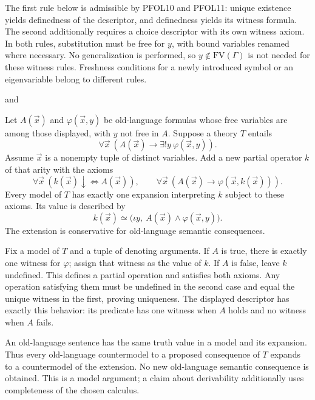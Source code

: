 The first rule below is admissible by PFOL10 and PFOL11: unique
existence yields definedness of the descriptor, and definedness yields
its witness formula. The second additionally requires a choice descriptor
with its own witness axiom. In both rules, substitution must be free for
$y$, with bound variables renamed where necessary. No generalization is
performed, so $y\notin\mathrm{FV}(\Gamma)$ is not needed for these
witness rules. Freshness conditions for a newly introduced symbol or an
eigenvariable belong to different rules.
\begin{prooftree}
\end{prooftree}
and
\begin{prooftree}
\end{prooftree}
\begin{theorem}
Let $A(\vec x)$ and $\varphi(\vec x,y)$ be old-language formulas whose
free variables are among those displayed, with $y$ not free in $A$.
Suppose a theory $T$ entails
\[
\forall\vec x\ (A(\vec x)\to\exists!y\ \varphi(\vec x,y)).
\]
Assume $\vec x$ is a nonempty tuple of distinct variables. Add a new
partial operator $k$ of that arity with the axioms
\[
\forall\vec x\ (k(\vec x)\downarrow\iff A(\vec x)),\qquad
\forall\vec x\ (A(\vec x)\to\varphi(\vec x,k(\vec x))).
\]
Every model of $T$ has exactly one expansion interpreting $k$ subject
to these axioms. Its value is described by
\[
k(\vec x)\simeq
\bigl(\iota y,\ A(\vec x)\land\varphi(\vec x,y)\bigr).
\]
The extension is conservative for old-language semantic consequences.
\end{theorem}
\Proof
Fix a model of $T$ and a tuple of denoting arguments. If $A$ is true,
there is exactly one witness for $\varphi$; assign that witness as the
value of $k$. If $A$ is false, leave $k$ undefined. This defines a
partial operation and satisfies both axioms. Any operation satisfying
them must be undefined in the second case and equal the unique witness
in the first, proving uniqueness. The displayed descriptor has exactly
this behavior: its predicate has one witness when $A$ holds and no
witness when $A$ fails.

An old-language sentence has the same truth value in a model and its
expansion. Thus every old-language countermodel to a proposed consequence
of $T$ expands to a countermodel of the extension. No new old-language
semantic consequence is obtained. This is a model argument; a claim
about derivability additionally uses completeness of the chosen calculus.
\Done

